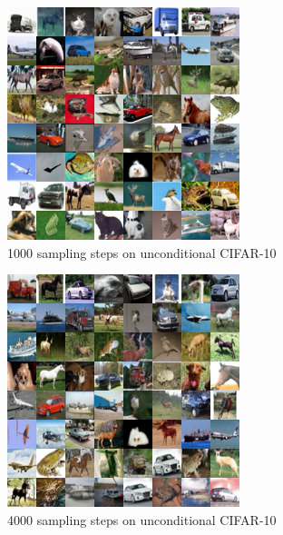 \documentclass{article}
\begin{document}
\begin{figure}[h!]
    \centerline{\includegraphics[width=0.78\columnwidth]{samples_cifar_hybrid_1000.png}}
    \caption{1000 sampling steps on unconditional CIFAR-10}
\end{figure}
\begin{figure}[h!]
    \centerline{\includegraphics[width=0.78\columnwidth]{samples_cifar_hybrid.png}}
    \caption{\label{fig:lastcifar} 4000 sampling steps on unconditional CIFAR-10}
    \vskip -0.4in
\end{figure}

\clearpage
\end{document}
